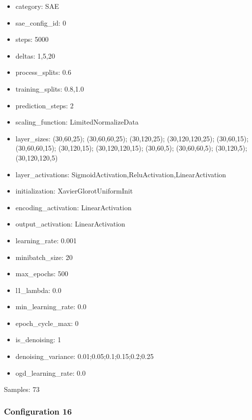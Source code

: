 \documentclass[a4paper,11pt,oneside]{article}
\theoremstyle{plain}
\theoremstyle{definition}
\begin{document}
	\begin{itemize}
		\item category: SAE
		\item sae\_config\_id: 0
		\item steps: 5000
		\item deltas: 1,5,20
		\item process\_splits: 0.6
		\item training\_splits: 0.8,1.0
		\item prediction\_steps: 2
		\item scaling\_function: LimitedNormalizeData
		\item layer\_sizes: (30,60,25); (30,60,60,25); (30,120,25); (30,120,120,25); (30,60,15); (30,60,60,15); (30,120,15); (30,120,120,15); (30,60,5); (30,60,60,5); (30,120,5); (30,120,120,5)
		\item layer\_activations: SigmoidActivation,ReluActivation,LinearActivation
		\item initialization: XavierGlorotUniformInit
		\item encoding\_activation: LinearActivation
		\item output\_activation: LinearActivation
		\item learning\_rate: 0.001
		\item minibatch\_size: 20
		\item max\_epochs: 500
		\item l1\_lambda: 0.0
		\item min\_learning\_rate: 0.0
		\item epoch\_cycle\_max: 0
		\item is\_denoising: 1
		\item denoising\_variance: 0.01;0.05;0.1;0.15;0.2;0.25
		\item ogd\_learning\_rate: 0.0
	\end{itemize}
	
	Samples: 73
	
	\subsubsection{Configuration 16}\label{config16}
	
\end{document}
